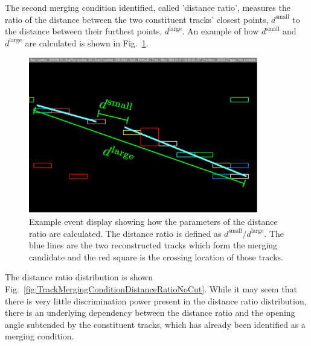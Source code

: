 \newline
\newline
The second merging condition identified, called 'distance ratio', measures the ratio of the distance between the two constituent tracks' closest points, $d^{\textrm{small}}$ to the distance between their furthest points, $d^{\textrm{large}}$.  An example of how $d^{\textrm{small}}$ and $d^{\textrm{large}}$ are calculated is shown in Fig.~\ref{fig:DistanceRatioEventDisplay}.    
\begin{figure}[!b]
  \centering
  \includegraphics[width=10cm]{images/selection/vertex_recon/distance_ratio_event_display}
  \caption{Example event display showing how the parameters of the distance ratio are calculated.  The distance ratio is defined as $d^{\textrm{small}}/d^{\textrm{large}}$.  The blue lines are the two reconstructed tracks which form the merging candidate and the red square is the crossing location of those tracks.}
  \label{fig:DistanceRatioEventDisplay}
\end{figure}
The distance ratio distribution is shown Fig.~\ref{fig:TrackMergingConditionDistanceRatioNoCut}.  While it may seem that there is very little discrimination power present in the distance ratio distribution, there is an underlying dependency between the distance ratio and the opening angle subtended by the constituent tracks, which has already been identified as a merging condition.
